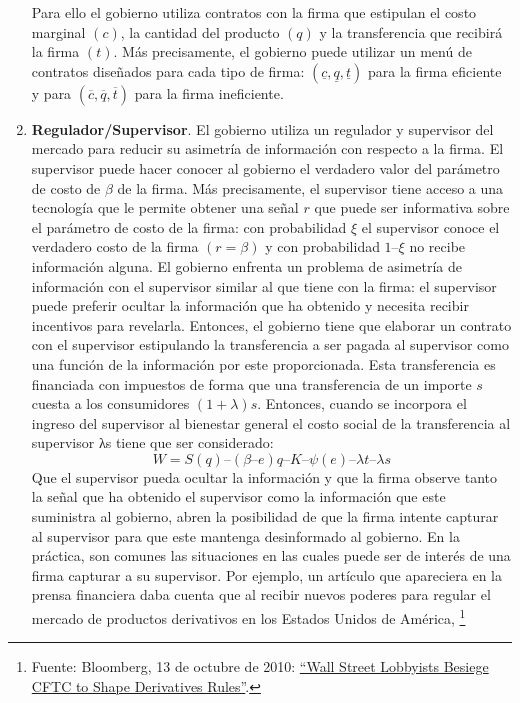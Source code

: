 \documentclass[
  12pt,
  spanish,
]{book}
\begin{document}
\begin{enumerate}
  Para ello el gobierno utiliza contratos con la firma que estipulan el costo marginal \((c)\), la cantidad del producto \((q)\) y la transferencia que recibirá la firma \((t)\). Más precisamente, el gobierno puede utilizar un menú de contratos diseñados para cada tipo de firma: \((\underline c, \underline q, \underline t )\) para la firma eficiente y para \((\overline c, \overline q, \overline t)\) para la firma ineficiente.
\item
  \textbf{Regulador/Supervisor}. El gobierno utiliza un regulador y supervisor del mercado para reducir su asimetría de información con respecto a la firma. El supervisor puede hacer conocer al gobierno el verdadero valor del parámetro de costo de \(β\) de la firma. Más precisamente, el supervisor tiene acceso a una tecnología que le permite obtener una señal \(r\) que puede ser informativa sobre el parámetro de costo de la firma: con probabilidad \(ξ\) el supervisor conoce el verdadero costo de la firma \((r = β)\) y con probabilidad \(1 – ξ\) no recibe información alguna.
  El gobierno enfrenta un problema de asimetría de información con el supervisor similar al que tiene con la firma: el supervisor puede preferir ocultar la información que ha obtenido y necesita recibir incentivos para revelarla. Entonces, el gobierno tiene que elaborar un contrato con el supervisor estipulando la transferencia a ser pagada al supervisor como una función de la información por este proporcionada. Esta transferencia es financiada con impuestos de forma que una transferencia de un importe \(s\) cuesta a los consumidores \((1 + λ)s\). Entonces, cuando se incorpora el ingreso del supervisor al bienestar general el costo social de la transferencia al supervisor λs tiene que ser considerado:
  \[W = S(q) – (β – e)q – K – ψ(e) – λt – λs\]
  Que el supervisor pueda ocultar la información y que la firma observe tanto la señal que ha obtenido el supervisor como la información que este suministra al gobierno, abren la posibilidad de que la firma intente capturar al supervisor para que este mantenga desinformado al gobierno.
  En la práctica, son comunes las situaciones en las cuales puede ser de interés de una firma capturar a su supervisor. Por ejemplo, un artículo que apareciera en la prensa financiera daba cuenta que al recibir nuevos poderes para regular el mercado de productos derivativos en los Estados Unidos de América,
  \footnote{Fuente: Bloomberg, 13 de octubre de 2010: \href{http://www.bloomberg.com/news/articles/2010-10-14/wall-street-lobbyists-besiege-cftc-to-influence-regulations-on-derivatives}{``Wall Street Lobbyists Besiege CFTC to Shape Derivatives Rules''}.}

\end{enumerate}
\end{document}
